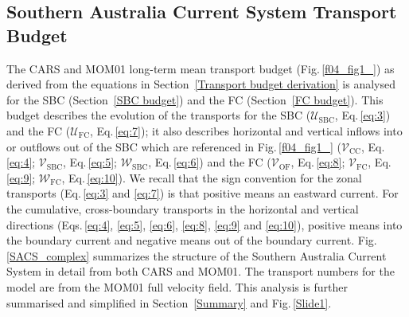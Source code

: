 \documentclass[preprint,3p,review,12pt]{elsarticle}
\newcommand{\sub}[1]{_{\text{#1}}}
\begin{document}
\subsection{Southern Australia Current System Transport Budget} \label{Southern Australia Current System Transport Budget}
The CARS and MOM01 long-term mean transport budget (Fig.\,\ref{f04_fig1_}) as derived from the equations in Section~\ref{Transport budget derivation} is analysed for the SBC (Section~\ref{SBC budget}) and the FC (Section~\ref{FC budget}). This budget describes the evolution of the transports for the SBC ($\mathcal{U}\sub{SBC}$, Eq.\,\ref{eq:3}) and the FC ($\mathcal{U}\sub{FC}$, Eq.\,\ref{eq:7});
it also describes
horizontal and vertical inflows into or outflows out of
the SBC which are referenced in Fig.\,\ref{f04_fig1_} ($\mathcal{V}\sub{CC}$, Eq.\,\ref{eq:4}; $\mathcal{V}\sub{SBC}$, Eq.\,\ref{eq:5}; $\mathcal{W}\sub{SBC}$, Eq.\,\ref{eq:6}) and
the FC ($\mathcal{V}\sub{OF}$, Eq.\,\ref{eq:8}; $\mathcal{V}\sub{FC}$, Eq.\,\ref{eq:9}; $\mathcal{W}\sub{FC}$, Eq.\,\ref{eq:10}).
We recall that the sign convention for the zonal transports (Eq.\,\ref{eq:3} and \ref{eq:7}) is that positive means an eastward current. For the cumulative, cross-boundary transports in the horizontal and vertical directions (Eqs.\,\ref{eq:4}, \ref{eq:5}, \ref{eq:6}, \ref{eq:8}, \ref{eq:9} and \ref{eq:10}), positive means into the boundary current and negative means out of the boundary current. Fig.\,\ref{SACS_complex} summarizes the structure of the Southern Australia Current System in detail from both CARS and MOM01. The transport numbers for the model are from the MOM01 full velocity field. This analysis is further summarised and simplified in Section~\ref{Summary} and Fig.\,\ref{Slide1}.
\end{document}
